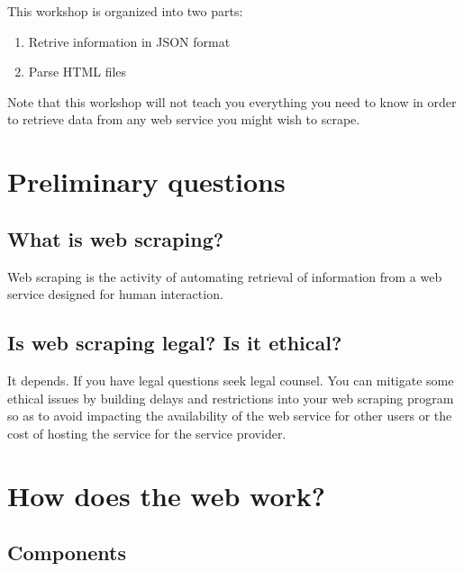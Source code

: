 \documentclass[
]{book}
\providecommand{\tightlist}{%
  \setlength{\itemsep}{0pt}\setlength{\parskip}{0pt}}
\begin{document}
This workshop is organized into two parts:

\begin{enumerate}
\def\labelenumi{\arabic{enumi}.}
\tightlist
\item
  Retrive information in JSON format
\item
  Parse HTML files
\end{enumerate}

Note that this workshop will not teach you everything you need to know in
order to retrieve data from any web service you might wish to scrape.

\hypertarget{preliminary-questions}{%
\section{Preliminary questions}\label{preliminary-questions}}

\hypertarget{what-is-web-scraping}{%
\subsection{What is web scraping?}\label{what-is-web-scraping}}

Web scraping is the activity of automating retrieval of information
from a web service designed for human interaction.

\hypertarget{is-web-scraping-legal-is-it-ethical}{%
\subsection{Is web scraping legal? Is it ethical?}\label{is-web-scraping-legal-is-it-ethical}}

It depends. If you have legal questions seek legal counsel. You can
mitigate some ethical issues by building delays and restrictions into
your web scraping program so as to avoid impacting the availability of
the web service for other users or the cost of hosting the service for
the service provider.

\hypertarget{how-does-the-web-work}{%
\section{How does the web work?}\label{how-does-the-web-work}}

\hypertarget{components}{%
\subsection{Components}\label{components}}
\end{document}
